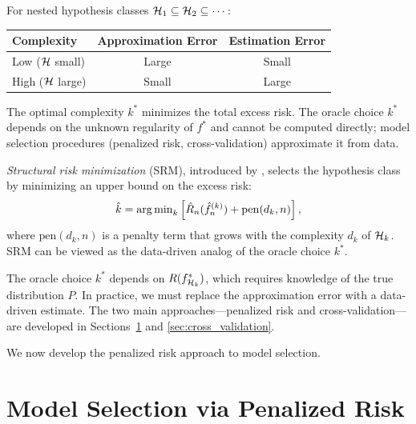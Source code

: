 \documentclass[11pt,a4paper]{article}
\begin{document}
\begin{keyresult}[title={Approximation-Estimation Tradeoff}]
For nested hypothesis classes $\mathcal{H}_1 \subseteq \mathcal{H}_2
\subseteq \cdots$:
\begin{center}
\begin{tabular}{lcc}
\toprule
\textbf{Complexity} & \textbf{Approximation Error} &
\textbf{Estimation Error} \\
\midrule
Low ($\mathcal{H}$ small) & Large & Small \\
High ($\mathcal{H}$ large) & Small & Large \\
\bottomrule
\end{tabular}
\end{center}
The optimal complexity $k^*$ minimizes the total excess risk.  The
oracle choice $k^*$ depends on the unknown regularity of $f^*$ and
cannot be computed directly; model selection procedures (penalized
risk, cross-validation) approximate it from data.
\end{keyresult}

\begin{definition}
\label{def:srm}
\emph{Structural risk minimization} (SRM), introduced by
\citet{vapnik1998}, selects the hypothesis class by minimizing
an upper bound on the excess risk:
\[
    \hat{k} = \operatorname{arg\,min}_k \left[\hat{R}_n(\hat{f}_n^{(k)})
    + \mathrm{pen}(d_k, n)\right],
\]
where $\mathrm{pen}(d_k, n)$ is a penalty term that grows with
the complexity $d_k$ of $\mathcal{H}_k$.  SRM can be viewed as the
data-driven analog of the oracle choice $k^*$.
\end{definition}

\begin{warning}[title={The Oracle is Not Computable}]
The oracle choice $k^*$ depends on $R(f_{\mathcal{H}_k}^*)$, which
requires knowledge of the true distribution $P$.  In practice, we
must replace the approximation error with a data-driven estimate.
The two main approaches---penalized risk and cross-validation---are
developed in Sections~\ref{sec:model_selection} and
\ref{sec:cross_validation}.
\end{warning}

We now develop the penalized risk approach to model selection.


\section{Model Selection via Penalized Risk}
\label{sec:model_selection}
\end{document}

